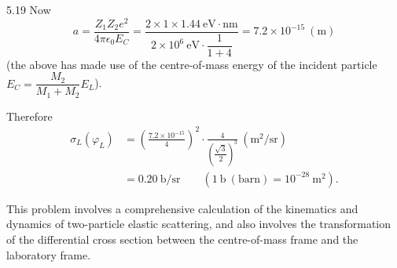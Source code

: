 \begin{solution}{5.19}
Now
\begin{equation*}
a=\frac{Z_1Z_2e^2}{4\pi\epsilon_0E_C}
=\frac{2\times 1\times 1.44\ \mathrm{eV}\cdot\mathrm{nm}}
{2\times10^6\ \mathrm{eV}\cdot\dfrac{1}{1+4}}=7.2\times10^{-15}\ (\mathrm{m})
\end{equation*}
(the above has made use of the centre-of-mass energy of the incident particle
$E_C=\dfrac{M_2}{M_1+M_2}E_L$).

Therefore
\begin{align*}
\sigma_L(\varphi_L)&=\left(\frac{7.2\times10^{-15}}{4}\right)^2\cdot
\frac{4}{\left(\dfrac{\sqrt{3}}{2}\right)^3}\ (\mathrm{m}^2/\mathrm{sr})\\
&=0.20\ \mathrm{b/sr}\qquad (1\ \mathrm{b}\ (\text{barn})=10^{-28}\ \mathrm{m}^2).
\end{align*}

\begin{commentary}
This problem involves a comprehensive calculation of the kinematics and dynamics of two-particle
elastic scattering, and also involves the transformation of the differential cross section
between the centre-of-mass frame and the laboratory frame.
\end{commentary}
\end{solution}

